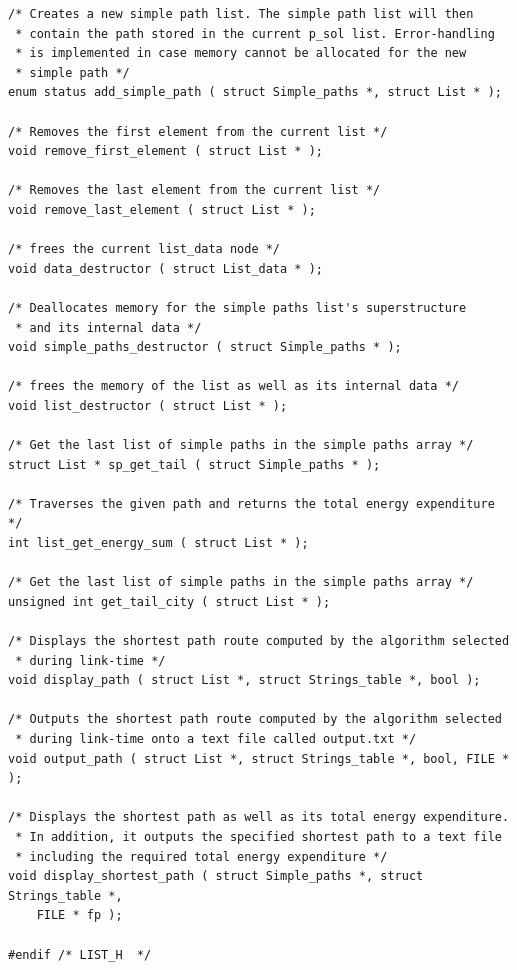 \documentclass[11pt]{article}
\begin{document}
\begin{verbatim}
/* Creates a new simple path list. The simple path list will then
 * contain the path stored in the current p_sol list. Error-handling
 * is implemented in case memory cannot be allocated for the new
 * simple path */
enum status add_simple_path ( struct Simple_paths *, struct List * );

/* Removes the first element from the current list */
void remove_first_element ( struct List * );

/* Removes the last element from the current list */
void remove_last_element ( struct List * );

/* frees the current list_data node */
void data_destructor ( struct List_data * );

/* Deallocates memory for the simple paths list's superstructure
 * and its internal data */
void simple_paths_destructor ( struct Simple_paths * );

/* frees the memory of the list as well as its internal data */
void list_destructor ( struct List * );

/* Get the last list of simple paths in the simple paths array */
struct List * sp_get_tail ( struct Simple_paths * );

/* Traverses the given path and returns the total energy expenditure */
int list_get_energy_sum ( struct List * );

/* Get the last list of simple paths in the simple paths array */
unsigned int get_tail_city ( struct List * );

/* Displays the shortest path route computed by the algorithm selected
 * during link-time */
void display_path ( struct List *, struct Strings_table *, bool );

/* Outputs the shortest path route computed by the algorithm selected
 * during link-time onto a text file called output.txt */
void output_path ( struct List *, struct Strings_table *, bool, FILE * );

/* Displays the shortest path as well as its total energy expenditure.
 * In addition, it outputs the specified shortest path to a text file
 * including the required total energy expenditure */
void display_shortest_path ( struct Simple_paths *, struct Strings_table *,
    FILE * fp );

#endif /* LIST_H  */
\end{verbatim}
\newpage
\end{document}
